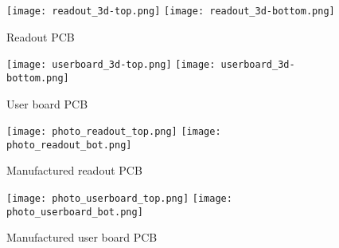 \FloatBarrier
\begin{figure}[htp!]
    \centering
    \texttt{[image: readout\_3d-top.png]}
    \texttt{[image: readout\_3d-bottom.png]}
    \caption{Readout PCB}
    \label{fig:readout_3d}
\end{figure}
\FloatBarrier

\FloatBarrier
\begin{figure}[htp!]
    \centering
    \texttt{[image: userboard\_3d-top.png]}
    \hspace{1.8cm}
    \texttt{[image: userboard\_3d-bottom.png]}
    \caption{User board PCB}
    \label{fig:userboard_3d}
\end{figure}
\FloatBarrier


\FloatBarrier
\begin{figure}[htp!]
    \centering
    \texttt{[image: photo\_readout\_top.png]}
    \texttt{[image: photo\_readout\_bot.png]}
    \caption{Manufactured readout PCB}
    \label{fig:photos_readout}
\end{figure}
\FloatBarrier

\FloatBarrier
\begin{figure}[htp!]
    \centering
    \texttt{[image: photo\_userboard\_top.png]}
    \hspace{1cm}
    \texttt{[image: photo\_userboard\_bot.png]}
    \caption{Manufactured user board PCB}
    \label{fig:photos_userboard}
\end{figure}
\FloatBarrier
